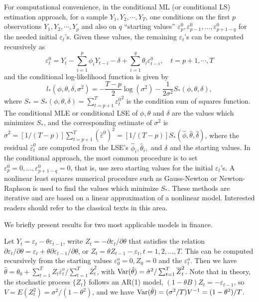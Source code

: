 For computational convenience, in the conditional ML (or conditional LS) estimation approach, for a sample $Y_1, Y_2,\cdots,Y_T$, one conditions on the first $p$ observations $Y_1,Y_2,\cdots,Y_p$ and also on $q$ ``starting values'' $\varepsilon_p^0, \varepsilon_{p-1}^0,\ldots,\varepsilon_{p+1-q}^0$ for the needed initial $\varepsilon_t$'s. Given these values, the remaining $\varepsilon_t$'s can be computed recursively as
	\[
	\varepsilon_t^0 = Y_t - \sum_{i=1}^p\phi_iY_{t-i} - \delta + \sum_{i=1}^q\theta_i\varepsilon_{t-i}^0, \quad t= p+1,\cdots,T
	\]
and the conditional log-likelihood function is given by
	\begin{equation}\label{eqn:llowstar}
	l_*(\phi,\theta,\delta,\sigma^2) = -\frac{T - p}{2} \log(\sigma^2) - \frac{1}{2\sigma^2}S_*(\phi,\theta,\delta),
	\end{equation}
where $S_* = S_*(\phi,\theta,\delta) = \sum_{t=p+1}^T {\varepsilon_t^0}^2$ is the condition sum of squares function. The conditional MLE or conditional LSE of $\phi,\theta$ and $\delta$ are the values which minimizes $S_*$, and the corresponding estimate of $\sigma^2$ is $\hat{\sigma}^2 = [1/(T - p)]\sum_{t=p+1}^T (\hat{\varepsilon}^0)^2 = [1/(T - p)]S_*(\hat{\phi},\hat{\theta},\hat{\delta})$, where the residual $\hat{\varepsilon}_t^0$ are computed from the LSE's $\hat{\phi}_i,\hat{\theta}_i,$ and $\delta$ and the starting values. In the conditional approach, the most common procedure is to set $\varepsilon_p^0 = 0,\ldots,\varepsilon_{p+1-q}^0 = 0$, that is, use zero starting values for the initial $\varepsilon_t$'s. A nonlinear least squares numerical procedure such as Gauss-Newton or Newton-Raphson is used to find the values which minimize $S_*$. These methods are iterative and are based on a linear approximation of a nonlinear model. Interested readers should refer to the classical texts in this area.


We briefly present results for two most applicable models in finance.


\begin{ex}[MA(1) Model)]
Let $Y_t = \varepsilon_t - \theta\varepsilon_{t-1}$, write $Z_t = -\partial\varepsilon_t/\partial\theta$ that satisfies the relation $\partial\varepsilon_t/\partial\theta = \varepsilon_t + \theta\partial\varepsilon_{t-1}/\partial\theta$, or $Z_t = \theta Z_{t-1} - \varepsilon_t, t = 1,2,\ldots,T$. This can be computed recursively from the starting values $\varepsilon_0^o = 0, Z_0 = 0$ and the $\varepsilon_t^o$. Then we have $\hat{\theta} = \theta_0 + \sum_{t=1}^T\overline{Z}_t\overline{\varepsilon}_t^o/\sum_{t=1}^T\overline{Z}_t^2$, with $\operatorname{Var}(\hat{\theta}) = \hat{\sigma}^2/\sum_{t=1}^T\overline{Z}_t^2$. Note that in theory, the stochastic process $\{Z_t\}$ follows an AR(1) model, $(1 - \theta B)Z_t = -\varepsilon_{t-1}$, so $V = E(Z_t^2) = \sigma^2/(1 - \theta^2)$, and we have $\operatorname{Var}(\hat{\theta}) = (\sigma^2/T)V^{-1} = (1 - \theta^2)/T$.
\end{ex}


